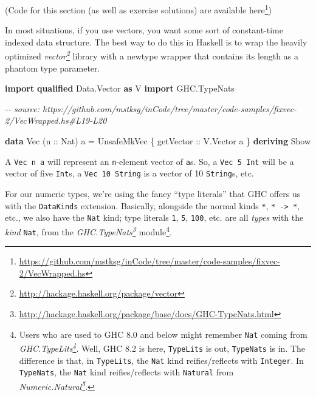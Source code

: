 \documentclass[]{article}
\newenvironment{Shaded}{}{}
\newcommand{\CommentTok}[1]{\textcolor[rgb]{0.38,0.63,0.69}{\textit{#1}}}
\newcommand{\DataTypeTok}[1]{\textcolor[rgb]{0.56,0.13,0.00}{#1}}
\newcommand{\KeywordTok}[1]{\textcolor[rgb]{0.00,0.44,0.13}{\textbf{#1}}}
\newcommand{\NormalTok}[1]{#1}
\newcommand{\OtherTok}[1]{\textcolor[rgb]{0.00,0.44,0.13}{#1}}
\renewcommand{\href}[2]{#2\footnote{\url{#1}}}
\begin{document}
(Code for this section (as well as exercise solutions) are
\href{https://github.com/mstksg/inCode/tree/master/code-samples/fixvec-2/VecWrapped.hs}{available
here})

In most situations, if you use vectors, you want some sort of constant-time
indexed data structure. The best way to do this in Haskell is to wrap the
heavily optimized
\emph{\href{http://hackage.haskell.org/package/vector}{vector}} library with a
newtype wrapper that contains its length as a phantom type parameter.

\begin{Shaded}
\begin{Highlighting}[]
\KeywordTok{import} \KeywordTok{qualified} \DataTypeTok{Data.Vector} \KeywordTok{as} \DataTypeTok{V}
\KeywordTok{import}           \DataTypeTok{GHC.TypeNats}

\CommentTok{{-}{-} source: https://github.com/mstksg/inCode/tree/master/code{-}samples/fixvec{-}2/VecWrapped.hs\#L19{-}L20}

\KeywordTok{data} \DataTypeTok{Vec}\NormalTok{ (}\OtherTok{n ::} \DataTypeTok{Nat}\NormalTok{) a }\OtherTok{=} \DataTypeTok{UnsafeMkVec}\NormalTok{ \{}\OtherTok{ getVector ::} \DataTypeTok{V.Vector}\NormalTok{ a \}}
    \KeywordTok{deriving} \DataTypeTok{Show}
\end{Highlighting}
\end{Shaded}

A \texttt{Vec\ n\ a} will represent an \texttt{n}-element vector of \texttt{a}s.
So, a \texttt{Vec\ 5\ Int} will be a vector of five \texttt{Int}s, a
\texttt{Vec\ 10\ String} is a vector of 10 \texttt{String}s, etc.

For our numeric types, we're using the fancy ``type literals'' that GHC offers
us with the \texttt{DataKinds} extension. Basically, alongside the normal kinds
\texttt{*}, \texttt{*\ -\textgreater{}\ *}, etc., we also have the \texttt{Nat}
kind; type literals \texttt{1}, \texttt{5}, \texttt{100}, etc. are all
\emph{types} with the \emph{kind} \texttt{Nat}, from the
\emph{\href{http://hackage.haskell.org/package/base/docs/GHC-TypeNats.html}{GHC.TypeNats}}
module\footnote{Users who are used to GHC 8.0 and below might remember
  \texttt{Nat} coming from
  \emph{\href{http://hackage.haskell.org/package/base/docs/GHC-TypeLits.html}{GHC.TypeLits}}.
  Well, GHC 8.2 is here, \texttt{TypeLits} is out, \texttt{TypeNats} is in. The
  difference is that, in \texttt{TypeLits}, the \texttt{Nat} kind
  reifies/reflects with \texttt{Integer}. In \texttt{TypeNats}, the \texttt{Nat}
  kind reifies/reflects with \texttt{Natural} from
  \emph{\href{http://hackage.haskell.org/package/base/docs/Numeric-Natural.html}{Numeric.Natural}}.}.
\end{document}
